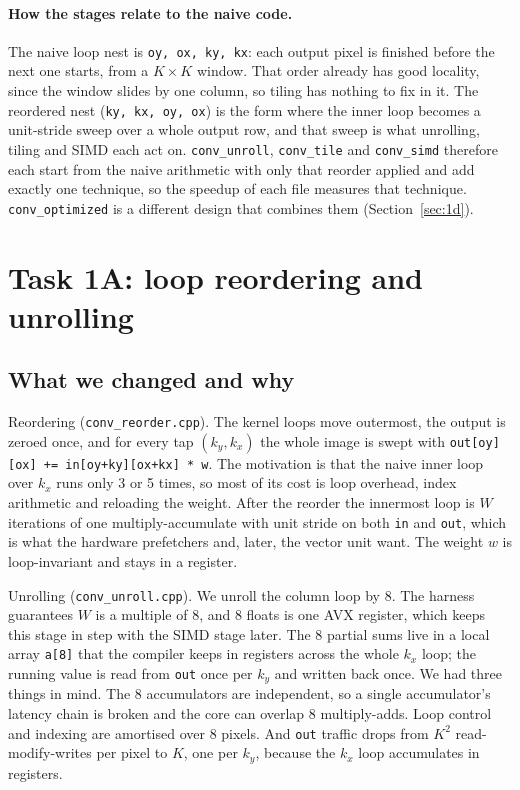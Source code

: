\documentclass[11pt,a4paper]{article}
\begin{document}
\paragraph{How the stages relate to the naive code.} The naive loop nest is \texttt{oy, ox, ky, kx}: each output pixel is finished before the next one starts, from a $K\times K$ window. That order already has good locality, since the window slides by one column, so tiling has nothing to fix in it. The reordered nest (\texttt{ky, kx, oy, ox}) is the form where the inner loop becomes a unit-stride sweep over a whole output row, and that sweep is what unrolling, tiling and SIMD each act on. \texttt{conv\_unroll}, \texttt{conv\_tile} and \texttt{conv\_simd} therefore each start from the naive arithmetic with only that reorder applied and add exactly one technique, so the speedup of each file measures that technique. \texttt{conv\_optimized} is a different design that combines them (Section~\ref{sec:1d}).

\section{Task 1A: loop reordering and unrolling}

\subsection{What we changed and why}

Reordering (\texttt{conv\_reorder.cpp}). The kernel loops move outermost, the output is zeroed once, and for every tap $(k_y,k_x)$ the whole image is swept with \texttt{out[oy][ox] += in[oy+ky][ox+kx] * w}. The motivation is that the naive inner loop over $k_x$ runs only 3 or 5 times, so most of its cost is loop overhead, index arithmetic and reloading the weight. After the reorder the innermost loop is $W$ iterations of one multiply-accumulate with unit stride on both \texttt{in} and \texttt{out}, which is what the hardware prefetchers and, later, the vector unit want. The weight $w$ is loop-invariant and stays in a register.

Unrolling (\texttt{conv\_unroll.cpp}). We unroll the column loop by 8. The harness guarantees $W$ is a multiple of 8, and 8 floats is one AVX register, which keeps this stage in step with the SIMD stage later. The 8 partial sums live in a local array \texttt{a[8]} that the compiler keeps in registers across the whole $k_x$ loop; the running value is read from \texttt{out} once per $k_y$ and written back once. We had three things in mind. The 8 accumulators are independent, so a single accumulator's latency chain is broken and the core can overlap 8 multiply-adds. Loop control and indexing are amortised over 8 pixels. And \texttt{out} traffic drops from $K^2$ read-modify-writes per pixel to $K$, one per $k_y$, because the $k_x$ loop accumulates in registers.
\end{document}
